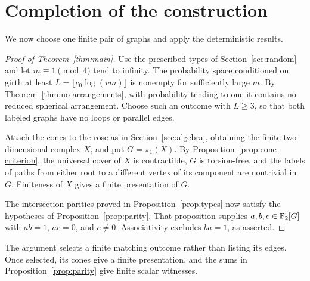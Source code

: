 \section{Completion of the construction}\label{sec:assembly}

We now choose one finite pair of graphs and apply the deterministic results.
\begin{proof}[Proof of Theorem~\ref{thm:main}]
Use the prescribed types of Section~\ref{sec:random} and let
$m\equiv1\pmod4$ tend to infinity. The probability space conditioned on girth
at least $L=\lfloor c_0\log(vm)\rfloor$ is nonempty for sufficiently large
$m$. By Theorem~\ref{thm:no-arrangements}, with probability tending to one
it contains no reduced spherical arrangement. Choose such an outcome with
$L\ge3$, so that both labeled graphs have no loops or parallel edges.

Attach the cones to the rose as in Section~\ref{sec:algebra}, obtaining the
finite two-dimensional complex $X$, and put $G=\pi_1(X)$. By
Proposition~\ref{prop:cone-criterion}, the universal cover of $X$ is
contractible, $G$ is torsion-free, and the labels of paths from either root to
a different vertex of its component are nontrivial in $G$. Finiteness of $X$
gives a finite presentation of $G$.

The intersection parities proved in Proposition~\ref{prop:types} now satisfy
the hypotheses of Proposition~\ref{prop:parity}. That proposition supplies
$a,b,c\in\mathbb F_2[G]$ with $ab=1$, $ac=0$, and $c\ne0$. Associativity excludes
$ba=1$, as asserted.
\end{proof}

The argument selects a finite matching outcome rather than listing its edges.
Once selected, its cones give a finite presentation, and the sums in
Proposition~\ref{prop:parity} give finite scalar witnesses.
